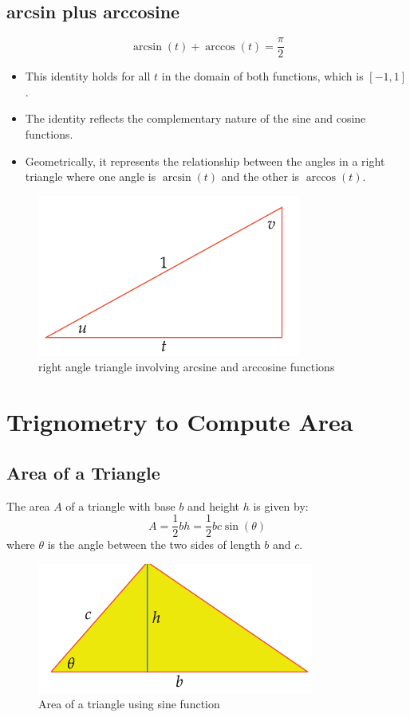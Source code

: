 \subsection{arcsin plus arccosine}
\[ \arcsin(t) + \arccos(t) = \frac{\pi}{2} \]
\begin{itemize}
    \item This identity holds for all $t$ in the domain of both functions, which is $[-1, 1]$.
    \item The identity reflects the complementary nature of the sine and cosine functions.
    \item Geometrically, it represents the relationship between the angles in a right triangle where one angle is $\arcsin(t)$ and the other is $\arccos(t)$.
\end{itemize}
\begin{figure}
    \centering
    \includegraphics[scale=0.4]{pics/24.png}
    \caption{right angle triangle involving arcsine and arccosine functions}
\end{figure}

\section{Trignometry to Compute Area}
\subsection{Area of a Triangle}
The area $A$ of a triangle with base $b$ and height $h$ is given by:
\[ A = \frac{1}{2} b h = \frac{1}{2} b c \sin(\theta) \]
where $\theta$ is the angle between the two sides of length $b$ and $c$.
\begin{figure}
    \centering
    \includegraphics[scale=0.4]{pics/25.png}
    \caption{Area of a triangle using sine function}
\end{figure}

